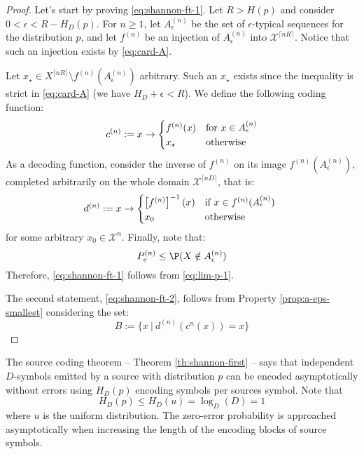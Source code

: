 \documentclass{../cs-classes/cs-classes}
\newcommand*{\X}{\mathcal{X}}
\begin{document}
\begin{proof}
    Let's start by proving \eqref{eq:shannon-ft-1}. Let $R>H(p)$ and consider $0<\epsilon<R-H_D(p)$. For $n\geq1$, let $A_\epsilon^{(n)}$ be the set of $\epsilon$-typical sequences for the distribution $p$, and let $f^{(n)}$ be an injection of $A_\epsilon^{(n)}$ into $\X^{\lceil nR\rceil}$. Notice that such an injection exists by \eqref{eq:card-A}.

    Let $x_\star\in X^{\lceil nR\rceil}\setminus f^{(n)}(A_\epsilon^{(n)})$ arbitrary. Such an $x_\star$ exists since the inequality is strict in \eqref{eq:card-A} (we have $H_D+\epsilon<R$). We define the following coding function:
    \begin{equation*}
        c^{(n)}:=x\to \begin{cases*}
            f^{(n)}(x) & for $x\in A_\epsilon^{(n)}$\\
            x_\star & otherwise
        \end{cases*}
    \end{equation*}
    As a decoding function, consider the inverse of $f^{(n)}$ on its image $f^{(n)}(A_\epsilon^{(n)})$, completed arbitrarily on the whole domain $\X^{\lceil nD\rceil}$, that is:
    \begin{equation*}
        d^{(n)}:=x\to\begin{cases*}
            \left[f^{(n)}\right]^{-1}(x) & if $x\in f^{(n)}(A_\epsilon^{(n)})$ \\
            x_0 & otherwise
        \end{cases*}
    \end{equation*}
    for some arbitrary $x_0\in \X^n$. Finally, note that:
    \begin{equation*}
        P_e^{(n)}\leq \P(X\notin A_\epsilon^{(n)})
    \end{equation*}
    Therefore, \eqref{eq:shannon-ft-1} follows from \eqref{eq:lim-p-1}.

    The second statement, \eqref{eq:shannon-ft-2}, follows from Property \ref{prop:a-eps-smallest} considering the set:
    \begin{equation*}
        B:=\{x \:|\: d^{(n)}\left(c^{n}(x)\right) = x\}
    \end{equation*}
\end{proof}

\begin{remark}
    The source coding theorem -- Theorem \ref{th:shannon-first} -- says that independent $D$-symbols emitted by a source with distribution $p$ can be encoded asymptotically without errors using $H_D(p)$ encoding symbols per sources symbol. Note that
    \begin{equation*}
        H_D(p)\leq H_D(u)=\log_D(D)=1
    \end{equation*}
    where $u$ is the uniform distribution. The zero-error probability is approached asymptotically when increasing the length of the encoding blocks of source symbols.
\end{remark}
\end{document}
